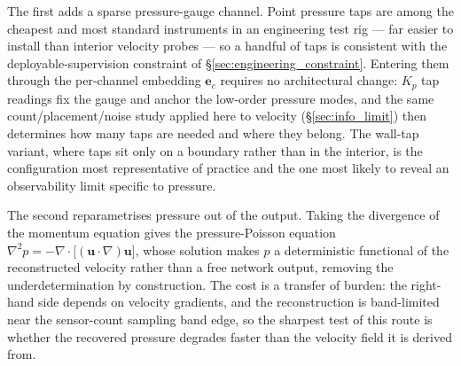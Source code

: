 \begin{enumerate}
    The first adds a sparse pressure-gauge channel. Point pressure taps are among the cheapest and most standard instruments in an engineering test rig --- far easier to install than interior velocity probes --- so a handful of taps is consistent with the deployable-supervision constraint of \S\ref{sec:engineering_constraint}. Entering them through the per-channel embedding $\mathbf{e}_c$ requires no architectural change: $K_p$ tap readings fix the gauge and anchor the low-order pressure modes, and the same count/placement/noise study applied here to velocity (\S\ref{sec:info_limit}) then determines how many taps are needed and where they belong. The wall-tap variant, where taps sit only on a boundary rather than in the interior, is the configuration most representative of practice and the one most likely to reveal an observability limit specific to pressure.

    The second reparametrises pressure out of the output. Taking the divergence of the momentum equation gives the pressure-Poisson equation $\nabla^2 p = -\nabla\cdot\big[(\mathbf{u}\cdot\nabla)\mathbf{u}\big]$, whose solution makes $p$ a deterministic functional of the reconstructed velocity rather than a free network output, removing the underdetermination by construction. The cost is a transfer of burden: the right-hand side depends on velocity gradients, and the reconstruction is band-limited near the sensor-count sampling band edge, so the sharpest test of this route is whether the recovered pressure degrades faster than the velocity field it is derived from.


\end{enumerate}
